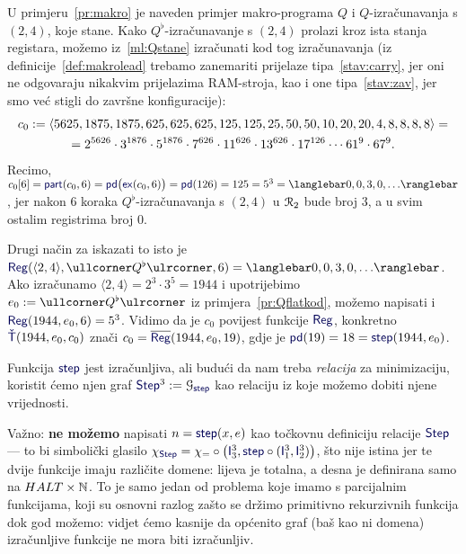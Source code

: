 \begin{primjer}[{name=[{kod $Q^\flat$-izračunavanja s ${(2,4)}$}]}]
U primjeru~\ref{pr:makro} je naveden primjer makro-programa $Q$ i $Q$-izračunavanja s $(2,4)$, koje stane. Kako $Q^\flat$-izračunavanje s $(2,4)$ prolazi kroz ista stanja registara, možemo iz~\eqref{ml:Qstane} izračunati kod tog izračunavanja (iz definicije~\ref{def:makrolead} trebamo zanemariti prijelaze tipa~\ref{stav:carry}, jer oni ne odgovaraju nikakvim prijelazima RAM-stroja, kao i one tipa~\ref{stav:zav}, jer smo već stigli do završne konfiguracije):
\begin{multline}
    c_0:=\langle5625,1875,1875,625,625,625,125,125,25,50,50,10,20,20,4,8,8,8,8\rangle=\\
    =2^{5626}\cdot3^{1876}\cdot5^{1876}\cdot7^{626}\cdot11^{626}\cdot13^{626}\cdot17^{126}\mathbin{\dotsm}61^9\cdot67^9\text.
\end{multline}
Recimo, $c_0[6]=\f{part}(c_0,6)=\f{pd}\bigl(\f{ex}(c_0,6)\bigr)=\f{pd}(126)=125=5^3=\knk{0,0,3,0,\dotsc}$, jer nakon $6$ koraka $Q^\flat$-izračunavanja s $(2,4)$ u $\mathcal R_{2}$ bude broj $3$, a u svim ostalim registrima broj $0$.

Drugi način za iskazati to isto je $\f{Reg}(\langle2,4\rangle,\kprog{Q^\flat},6)=\knk{0,0,3,0,\dotsc}$. Ako iz\-ra\-ču\-na\-mo $\langle2,4\rangle=2^3\cdot3^5=1944$ i upotrijebimo $e_0:=\kprog{Q^\flat}$ iz primjera~\ref{pr:Qflatkod}, možemo napisati i $\f{Reg}(1944,e_0,6)=5^3$. Vidimo da je $c_0$ povijest funkcije $\f{Reg}$, konkretno $\f{\check T}(1944,e_0,c_0)$ znači $c_0=\overline{\f{Reg}}(1944,e_0,19)$, gdje je $\f{pd}(19)=18=\f{step}(1944,e_0)$.
\end{primjer}


Funkcija $\f{step}$ jest izračunljiva, ali budući da nam treba \emph{relacija} za minimizaciju, koristit ćemo njen graf $\f{Step}^3:=\graf{\f{step}}$ kao relaciju iz koje možemo dobiti njene vrijednosti.

\begin{napomena}[{name=[problemi s parcijalnom jednakošću]}]\label{nap:parc=}
Važno: \textbf{ne možemo} napisati $n=\f{step}(x,e)$ kao točkovnu definiciju relacije $\f{Step}$ --- to bi simbolički glasilo $\chi_{\f{Step}}=\chi_=\circ\bigl(\f I_3^3,\f{step}\circ(\f I_1^3,\f I_2^3)\bigr)$, što nije istina jer te dvije funkcije imaju različite domene: lijeva je totalna, a desna je definirana samo na $HALT\times{\mathbb N}$. To je samo jedan od problema koje imamo s parcijalnim funkcijama, koji su osnovni razlog zašto se držimo primitivno rekurzivnih funkcija dok god možemo: vidjet ćemo kasnije da općenito graf (baš kao ni domena) izračunljive funkcije ne mora biti izračunljiv.
\end{napomena}

